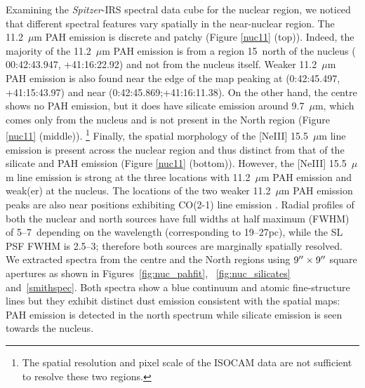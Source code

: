 \documentclass[useAMS,usenatbib,a4paper]{mn2e}
\begin{document}
Examining the {\em Spitzer}-IRS spectral data cube for the nuclear region, we noticed that different spectral features vary spatially in the near-nuclear region.
The 11.2~$\mu$m PAH emission is discrete and patchy (Figure \ref{nuc11} (top)).  Indeed, the majority of the 11.2~$\mu$m  PAH emission is from a region 15\arcsec\ north of the nucleus (
00:42:43.947, +41:16:22.92) and not from the nucleus itself. Weaker 11.2~$\mu$m PAH emission is also found near the edge of the map peaking at (0:42:45.497, +41:15:43.97) and near (0:42:45.869;+41:16:11.38).
On the other hand, the centre shows no PAH emission, but it does have silicate emission around 9.7~$\mu$m, which comes only from the nucleus and is not present in the North region (Figure \ref{nuc11} (middle)).%
\footnote{The spatial resolution and pixel scale of the ISOCAM data are not sufficient to resolve these two regions.}
Finally, the spatial morphology of the [NeIII] 15.5~$\mu$m line emission is present across the nuclear region and thus distinct from that of the silicate and PAH emission (Figure \ref{nuc11} (bottom)). However, the [NeIII] 15.5~$\mu$m line emission is strong at the three locations with 11.2~$\mu$m PAH emission and weak(er) at the nucleus. The locations of the two weaker 11.2~$\mu$m PAH emission peaks are also near positions exhibiting CO(2-1) line emission \citep[\#36 and 28 of][the strongest 11.2~$\mu$m PAH emission peak is outside the CO FOV]{Melchior2013}. 
Radial profiles of both the nuclear and north sources have full widths at half maximum (FWHM) of 5--7\arcsec\ 
depending on the wavelength (corresponding to 19--27pc), while the SL PSF FWHM is 2.5--3\arcsec; therefore both sources are marginally spatially resolved.  
We extracted spectra from the centre and the North regions using  $9\hbox{$^{\prime\prime}$} \times 9\hbox{$^{\prime\prime}$}$ 
square apertures as shown in Figures~\ref{fig:nuc_pahfit}, ~\ref{fig:nuc_silicates} and~\ref{smithspec}. 
Both spectra show a blue continuum and atomic fine-structure lines but they exhibit distinct dust emission consistent with the spatial maps: PAH emission is detected in the north spectrum while silicate emission is seen towards the nucleus. 
\end{document}
